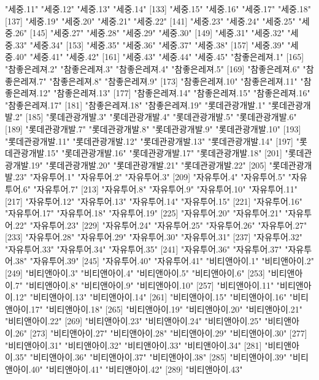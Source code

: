 \begin{Schunk}
\begin{Soutput}
[129] "세중.11"         "세중.12"         "세중.13"         "세중.14"        
[133] "세중.15"         "세중.16"         "세중.17"         "세중.18"        
[137] "세중.19"         "세중.20"         "세중.21"         "세중.22"        
[141] "세중.23"         "세중.24"         "세중.25"         "세중.26"        
[145] "세중.27"         "세중.28"         "세중.29"         "세중.30"        
[149] "세중.31"         "세중.32"         "세중.33"         "세중.34"        
[153] "세중.35"         "세중.36"         "세중.37"         "세중.38"        
[157] "세중.39"         "세중.40"         "세중.41"         "세중.42"        
[161] "세중.43"         "세중.44"         "세중.45"         "참좋은레져.1"   
[165] "참좋은레져.2"    "참좋은레져.3"    "참좋은레져.4"    "참좋은레져.5"   
[169] "참좋은레져.6"    "참좋은레져.7"    "참좋은레져.8"    "참좋은레져.9"   
[173] "참좋은레져.10"   "참좋은레져.11"   "참좋은레져.12"   "참좋은레져.13"  
[177] "참좋은레져.14"   "참좋은레져.15"   "참좋은레져.16"   "참좋은레져.17"  
[181] "참좋은레져.18"   "참좋은레져.19"   "롯데관광개발.1"  "롯데관광개발.2" 
[185] "롯데관광개발.3"  "롯데관광개발.4"  "롯데관광개발.5"  "롯데관광개발.6" 
[189] "롯데관광개발.7"  "롯데관광개발.8"  "롯데관광개발.9"  "롯데관광개발.10"
[193] "롯데관광개발.11" "롯데관광개발.12" "롯데관광개발.13" "롯데관광개발.14"
[197] "롯데관광개발.15" "롯데관광개발.16" "롯데관광개발.17" "롯데관광개발.18"
[201] "롯데관광개발.19" "롯데관광개발.20" "롯데관광개발.21" "롯데관광개발.22"
[205] "롯데관광개발.23" "자유투어.1"      "자유투어.2"      "자유투어.3"     
[209] "자유투어.4"      "자유투어.5"      "자유투어.6"      "자유투어.7"     
[213] "자유투어.8"      "자유투어.9"      "자유투어.10"     "자유투어.11"    
[217] "자유투어.12"     "자유투어.13"     "자유투어.14"     "자유투어.15"    
[221] "자유투어.16"     "자유투어.17"     "자유투어.18"     "자유투어.19"    
[225] "자유투어.20"     "자유투어.21"     "자유투어.22"     "자유투어.23"    
[229] "자유투어.24"     "자유투어.25"     "자유투어.26"     "자유투어.27"    
[233] "자유투어.28"     "자유투어.29"     "자유투어.30"     "자유투어.31"    
[237] "자유투어.32"     "자유투어.33"     "자유투어.34"     "자유투어.35"    
[241] "자유투어.36"     "자유투어.37"     "자유투어.38"     "자유투어.39"    
[245] "자유투어.40"     "자유투어.41"     "비티앤아이.1"    "비티앤아이.2"   
[249] "비티앤아이.3"    "비티앤아이.4"    "비티앤아이.5"    "비티앤아이.6"   
[253] "비티앤아이.7"    "비티앤아이.8"    "비티앤아이.9"    "비티앤아이.10"  
[257] "비티앤아이.11"   "비티앤아이.12"   "비티앤아이.13"   "비티앤아이.14"  
[261] "비티앤아이.15"   "비티앤아이.16"   "비티앤아이.17"   "비티앤아이.18"  
[265] "비티앤아이.19"   "비티앤아이.20"   "비티앤아이.21"   "비티앤아이.22"  
[269] "비티앤아이.23"   "비티앤아이.24"   "비티앤아이.25"   "비티앤아이.26"  
[273] "비티앤아이.27"   "비티앤아이.28"   "비티앤아이.29"   "비티앤아이.30"  
[277] "비티앤아이.31"   "비티앤아이.32"   "비티앤아이.33"   "비티앤아이.34"  
[281] "비티앤아이.35"   "비티앤아이.36"   "비티앤아이.37"   "비티앤아이.38"  
[285] "비티앤아이.39"   "비티앤아이.40"   "비티앤아이.41"   "비티앤아이.42"  
[289] "비티앤아이.43"  
\end{Soutput}
\end{Schunk}

